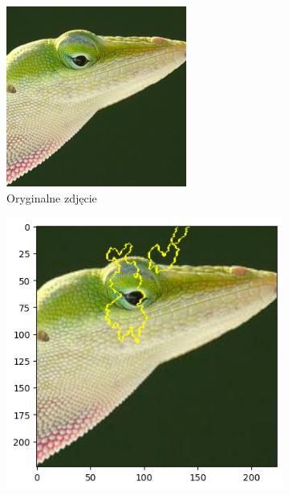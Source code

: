 \begin{figure}[h]
	\centering
	\begin{subfigure}[b]{0.3\textwidth}
		\includegraphics[width=.9\textwidth]{img/examples/appendix/n01682714_14308}
		\caption{Oryginalne zdjęcie}  \label{}
	\end{subfigure}
	\begin{subfigure}[b]{0.3\textwidth}
		\centering\includegraphics[width=.9\textwidth]{img/examples/appendix/n01682714_14308_lime}

\end{subfigure}
\end{figure}

